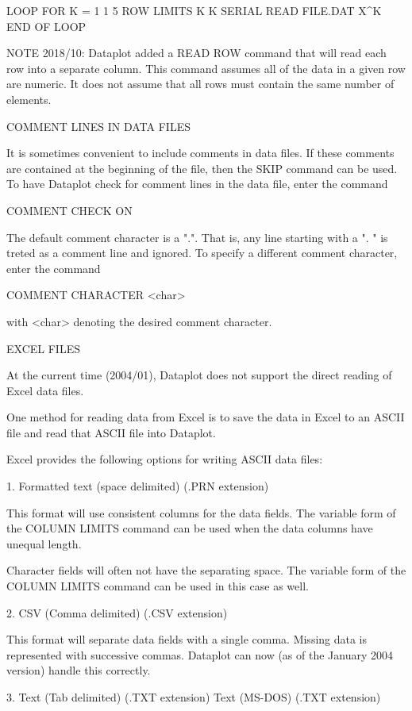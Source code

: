    LOOP FOR K = 1 1 5
      ROW LIMITS K K
      SERIAL READ FILE.DAT  X^K
   END OF LOOP

NOTE 2018/10: Dataplot added a READ ROW command that will read each row
              into a separate column.  This command assumes all of the
              data in a given row are numeric.  It does not assume that
              all rows must contain the same number of elements.

COMMENT LINES IN DATA FILES

It is sometimes convenient to include comments in data files.
If these comments are contained at the beginning of the file, then
the SKIP command can be used.  To have Dataplot check for comment
lines in the data file, enter the command

    COMMENT CHECK ON

The default comment character is a ".".  That is, any line starting
with a ". " is treted as a comment line and ignored.  To specify
a different comment character, enter the command

    COMMENT CHARACTER  <char>

with <char> denoting the desired comment character.


EXCEL FILES

At the current time (2004/01), Dataplot does not support the
direct reading of Excel data files.

One method for reading data from Excel is to save the data in Excel to
an ASCII file and read that ASCII file into Dataplot.
 
Excel provides the following options for writing ASCII data
files:

  1. Formatted text (space delimited) (.PRN extension)

     This format will use consistent columns for the data fields.
     The variable form of the COLUMN LIMITS command can be used
     when the data columns have unequal length.

     Character fields will often not have the separating space.  The
     variable form of the COLUMN LIMITS command can be used in this
     case as well.

  2. CSV (Comma delimited) (.CSV extension)

     This format will separate data fields with a single comma.
     Missing data is represented with successive commas.  Dataplot
     can now (as of the January 2004 version) handle this correctly.

  3. Text (Tab delimited) (.TXT extension)
     Text (MS-DOS) (.TXT extension)


